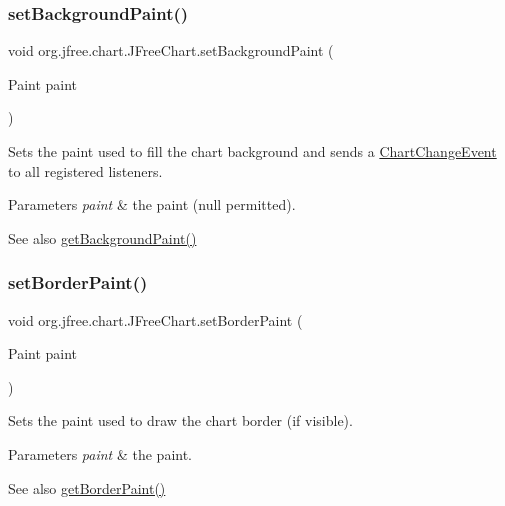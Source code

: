 \subsubsection{\texorpdfstring{set\+Background\+Paint()}{setBackgroundPaint()}}
{\footnotesize\ttfamily void org.\+jfree.\+chart.\+J\+Free\+Chart.\+set\+Background\+Paint (\begin{DoxyParamCaption}\item[{Paint}]{paint }\end{DoxyParamCaption})}

Sets the paint used to fill the chart background and sends a \mbox{\hyperlink{}{Chart\+Change\+Event}} to all registered listeners.


\begin{DoxyParams}{Parameters}
{\em paint} & the paint ({\ttfamily null} permitted).\\
\hline
\end{DoxyParams}
\begin{DoxySeeAlso}{See also}
\mbox{\hyperlink{classorg_1_1jfree_1_1chart_1_1_j_free_chart_af0544f25aaf27bda9f06147c249156f3}{get\+Background\+Paint()}} 
\end{DoxySeeAlso}
\mbox{\label{classorg_1_1jfree_1_1chart_1_1_j_free_chart_ad6e69d2966aaecdbc060d61a39bf5e1c}} 
\subsubsection{\texorpdfstring{set\+Border\+Paint()}{setBorderPaint()}}
{\footnotesize\ttfamily void org.\+jfree.\+chart.\+J\+Free\+Chart.\+set\+Border\+Paint (\begin{DoxyParamCaption}\item[{Paint}]{paint }\end{DoxyParamCaption})}

Sets the paint used to draw the chart border (if visible).


\begin{DoxyParams}{Parameters}
{\em paint} & the paint.\\
\hline
\end{DoxyParams}
\begin{DoxySeeAlso}{See also}
\mbox{\hyperlink{classorg_1_1jfree_1_1chart_1_1_j_free_chart_ad054ae2945e4634fd962c9bf2029c15f}{get\+Border\+Paint()}} 
\end{DoxySeeAlso}
\mbox{\label{classorg_1_1jfree_1_1chart_1_1_j_free_chart_a1be1fe771e4369d7b425a77bc8ba3d71}} 
